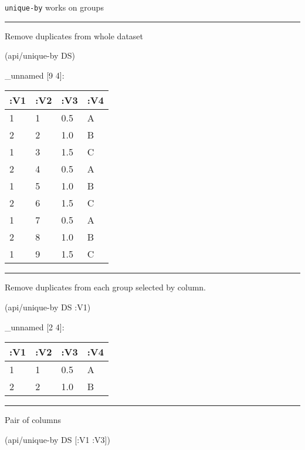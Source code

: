 \documentclass[]{article}
\newenvironment{Shaded}{\begin{snugshade}}{\end{snugshade}}
\newcommand{\AttributeTok}[1]{\textcolor[rgb]{0.77,0.63,0.00}{#1}}
\newcommand{\NormalTok}[1]{#1}
\begin{document}
\texttt{unique-by} works on groups

\begin{center}\rule{0.5\linewidth}{0.5pt}\end{center}

Remove duplicates from whole dataset

\begin{Shaded}
\begin{Highlighting}[]
\NormalTok{(api/unique-by DS)}
\end{Highlighting}
\end{Shaded}

\_unnamed {[}9 4{]}:

\begin{longtable}[]{@{}llll@{}}
\toprule
:V1 & :V2 & :V3 & :V4\tabularnewline
\midrule
\endhead
1 & 1 & 0.5 & A\tabularnewline
2 & 2 & 1.0 & B\tabularnewline
1 & 3 & 1.5 & C\tabularnewline
2 & 4 & 0.5 & A\tabularnewline
1 & 5 & 1.0 & B\tabularnewline
2 & 6 & 1.5 & C\tabularnewline
1 & 7 & 0.5 & A\tabularnewline
2 & 8 & 1.0 & B\tabularnewline
1 & 9 & 1.5 & C\tabularnewline
\bottomrule
\end{longtable}

\begin{center}\rule{0.5\linewidth}{0.5pt}\end{center}

Remove duplicates from each group selected by column.

\begin{Shaded}
\begin{Highlighting}[]
\NormalTok{(api/unique-by DS }\AttributeTok{:V1}\NormalTok{)}
\end{Highlighting}
\end{Shaded}

\_unnamed {[}2 4{]}:

\begin{longtable}[]{@{}llll@{}}
\toprule
:V1 & :V2 & :V3 & :V4\tabularnewline
\midrule
\endhead
1 & 1 & 0.5 & A\tabularnewline
2 & 2 & 1.0 & B\tabularnewline
\bottomrule
\end{longtable}

\begin{center}\rule{0.5\linewidth}{0.5pt}\end{center}

Pair of columns

\begin{Shaded}
\begin{Highlighting}[]
\NormalTok{(api/unique-by DS [}\AttributeTok{:V1} \AttributeTok{:V3}\NormalTok{])}
\end{Highlighting}
\end{Shaded}
\end{document}
